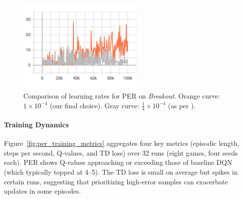 \begin{figure}
	\centering
	\includegraphics[width=0.55\textwidth]{figures/per/per_lr_charts_episodic_return.jpeg}
	\caption{Comparison of learning rates for PER on \emph{Breakout}. 
		Orange curve: $1\times10^{-4}$ (our final choice). 
		Gray curve: $\tfrac{1}{4}\times10^{-4}$ (as per \cite{schaul:prioritized}).}
	\label{fig:per_lr_comparison}
\end{figure}

\paragraph{Training Dynamics}
Figure~\vref{fig:per_training_metrics} aggregates four key metrics (episodic length, steps per second, Q-values, and TD loss) over 32 runs (eight games, four seeds each). PER shows Q-values approaching or exceeding those of baseline DQN (which typically topped at 4--5). The TD loss is small on average but spikes in certain runs, suggesting that prioritizing high-error samples can exacerbate updates in some episodes.

